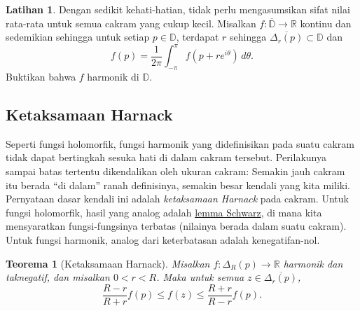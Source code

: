 \documentclass[12pt,openany]{book}
\newcommand{\R}{{\mathbb{R}}}
\newcommand{\D}{{\mathbb{D}}}
\newcommand{\myquote}[1]{``#1''}
\theoremstyle{plain}
\newtheorem{thm}{Teorema}[section]
\theoremstyle{remark}
\theoremstyle{definition}
\newenvironment{exbox}{%
    \def\FrameCommand{\vrule width 1pt \relax\hspace{10pt}}%
    \MakeFramed{\advance\hsize-\width\FrameRestore}%
}{%
    \endMakeFramed
}
\theoremstyle{exercise}
\newtheorem{exercise}{Latihan}[section]
\theoremstyle{example}
\begin{document}
\begin{exbox}
\begin{exercise}
Dengan sedikit kehati-hatian,
tidak perlu mengasumsikan sifat nilai rata-rata untuk semua cakram yang cukup kecil.
Misalkan $f \colon \overline{\D} \to \R$
kontinu dan sedemikian sehingga untuk setiap $p \in \D$, terdapat $r$ sehingga
$\overline{\Delta_r(p)} \subset \D$ dan 
\begin{equation*}
f(p) = \frac{1}{2\pi} \int_{-\pi}^{\pi} f(p+re^{i\theta})\, d\theta .
\end{equation*}
Buktikan bahwa $f$ harmonik di $\D$.
\end{exercise}
\end{exbox}

\subsection{Ketaksamaan Harnack}

Seperti fungsi holomorfik, fungsi harmonik yang didefinisikan pada suatu
cakram tidak dapat bertingkah sesuka hati di dalam cakram tersebut.  Perilakunya
sampai batas tertentu dikendalikan oleh ukuran cakram: Semakin jauh cakram itu berada
\myquote{di dalam} ranah definisinya, semakin besar kendali yang kita miliki.
Pernyataan dasar kendali ini adalah
\emph{ketaksamaan Harnack} pada cakram.
Untuk fungsi holomorfik, hasil yang analog adalah
\hyperref[lemma:schwarz]{lemma Schwarz}, di mana kita
mensyaratkan fungsi-fungsinya terbatas (nilainya berada dalam suatu cakram).  Untuk fungsi
harmonik, analog dari keterbatasan adalah kenegatifan-nol.

\begin{thm}[Ketaksamaan Harnack]
\label{thm:harnackineqdisc}
Misalkan $f \colon \Delta_R(p) \to \R$ harmonik dan taknegatif,
dan misalkan $0 < r < R$.
Maka untuk semua $z \in \overline{\Delta_r(p)}$,
\begin{equation*}
\frac{R-r}{R+r} f(p) \leq f(z) \leq \frac{R+r}{R-r} f(p) .
\end{equation*}
\end{thm}
\end{document}
